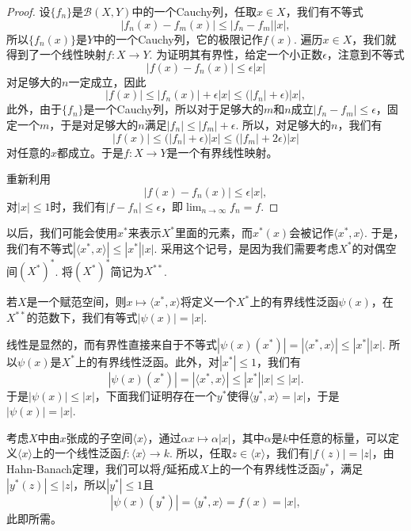 \begin{proof}
	设$\{f_n\}$是$\mathcal{B}(X,Y)$中的一个Cauchy列，任取$x\in X$，我们有不等式
	\[
	|f_n(x)-f_m(x)|\leq |f_n-f_m||x|,
	\]
	所以$\{f_n(x)\}$是$Y$中的一个Cauchy列，它的极限记作$f(x)$. 遍历$x\in X$，我们就得到了一个线性映射$f:X\to Y$. 为证明其有界性，给定一个小正数$\epsilon$，注意到不等式
	\[
	|f(x)-f_n(x)|\leq \epsilon |x|
	\]
	对足够大的$n$一定成立，因此
	\[
	|f(x)|\leq |f_n(x)|+\epsilon|x|\leq \bigl(|f_n|+\epsilon\bigr) |x|,
	\]
	此外，由于$\{f_n\}$是一个Cauchy列，所以对于足够大的$m$和$n$成立$|f_n-f_m|\leq \epsilon$，固定一个$m$，于是对足够大的$n$满足$|f_n|\leq |f_m|+\epsilon$. 所以，对足够大的$n$，我们有
	\[
	|f(x)|\leq \bigl(|f_n|+\epsilon\bigr) |x|\leq \bigl(|f_m|+2\epsilon\bigr) |x|
	\]
	对任意的$x$都成立。于是$f:X\to Y$是一个有界线性映射。

	重新利用
	\[
	|f(x)-f_n(x)|\leq \epsilon |x|,
	\]
	对$|x|\leq 1$时，我们有$|f-f_n|\leq \epsilon$，即$\lim_{n\to\infty}f_n=f$.
\end{proof}

以后，我们可能会使用$x^*$来表示$X^*$里面的元素，而$x^*(x)$会被记作$\langle x^*,x\rangle$. 于是，我们有不等式$|\langle x^*,x\rangle|\leq |x^*||x|$. 采用这个记号，是因为我们需要考虑$X^*$的对偶空间$(X^*)^*$. 将$(X^*)^*$简记为$X^{**}$.

\begin{lem}
	若$X$是一个赋范空间，则$x\mapsto \langle x^*,x\rangle$将定义一个$X^*$上的有界线性泛函$\psi(x)$，在$X^{**}$的范数下，我们有等式$|\psi(x)|=|x|$.
\end{lem}

线性是显然的，而有界性直接来自于不等式$|\psi(x)(x^*)|=|\langle x^*,x\rangle|\leq |x^*||x|$. 所以$\psi(x)$是$X^*$上的有界线性泛函。此外，对$|x^*|\leq 1$，我们有
\[
	|\psi(x)(x^*)|=|\langle x^*,x\rangle|\leq |x^*||x|\leq |x|.
\]
于是$|\psi(x)|\leq |x|$，下面我们证明存在一个$y^*$使得$\langle y^*,x\rangle=|x|$，于是$|\psi(x)|=|x|$.

考虑$X$中由$x$张成的子空间$\langle x\rangle$，通过$\alpha x\mapsto \alpha|x|$，其中$\alpha$是$k$中任意的标量，可以定义$\langle x\rangle$上的一个线性泛函$f:\langle x\rangle\to k$. 所以，任取$z\in \langle x\rangle$，我们有$|f(z)|=|z|$，由Hahn-Banach定理，我们可以将$f$延拓成$X$上的一个有界线性泛函$y^*$，满足$|y^*(z)|\leq |z|$，所以$|y^*|\leq 1$且
\[
	|\psi(x)(y^*)|=\langle y^*,x\rangle = f(x) =|x|,
\]
此即所需。


